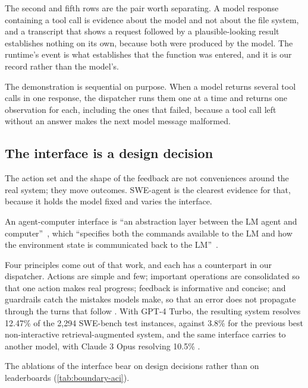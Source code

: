 The second and fifth rows are the pair worth separating. A model response containing a tool call is
evidence about the model and not about the file system, and a transcript that shows a request
followed by a plausible-looking result establishes nothing on its own, because both were produced by
the model. The runtime's  event is what establishes that the function was
entered, and it is our record rather than the model's.

The demonstration is sequential on purpose. When a model returns several tool calls in one
response, the dispatcher runs them one at a time and returns one observation for each, including
the ones that failed, because a tool call left without an answer makes the next model message
malformed.

\subsection{The interface is a design decision}
\label{sec:boundary-aci}

The action set and the shape of the feedback are not conveniences around the real system; they move
outcomes. SWE-agent is the clearest evidence for that, because it holds the model fixed and varies
the interface.

\begin{definition}
\label{def:aci}
An agent-computer interface is ``an abstraction layer between the LM agent and
computer''~\citep{yang2024sweagent}, which ``specifies both the commands available to the LM and how
the environment state is communicated back to the LM''~\citep[\S2]{yang2024sweagent}.
\end{definition}

Four principles come out of that work, and each has a counterpart in our dispatcher. Actions are
simple and few; important operations are consolidated so that one action makes real progress;
feedback is informative and concise; and guardrails catch the mistakes models make, so that an error
does not propagate through the turns that follow \citep[\S2]{yang2024sweagent}. With GPT-4 Turbo, the resulting system resolves 12.47\%
of the 2,294 SWE-bench test instances, against 3.8\% for the previous best non-interactive
retrieval-augmented system, and the same interface carries to another model, with Claude 3 Opus
resolving 10.5\% \citep[\S1]{yang2024sweagent}.

The ablations of the interface bear on design decisions rather than on leaderboards
(\cref{tab:boundary-aci}).

